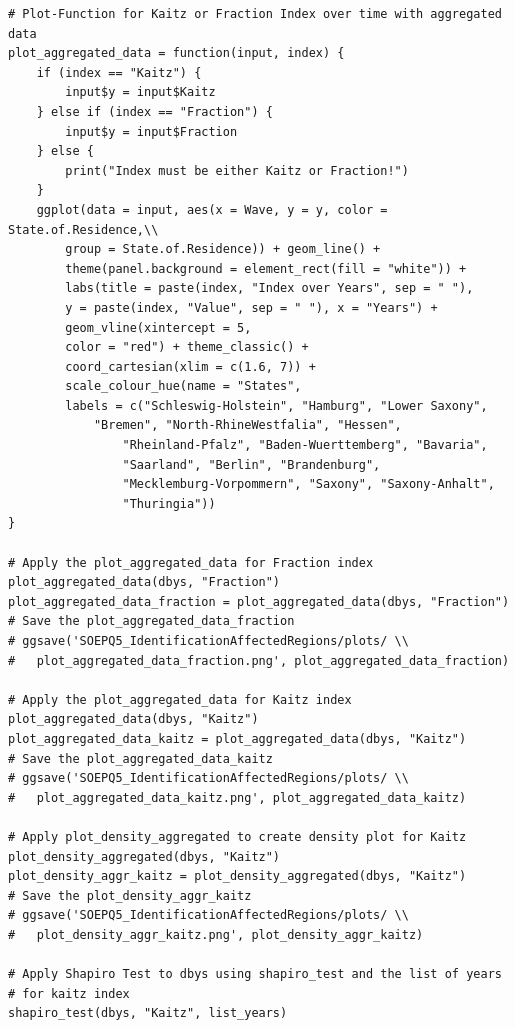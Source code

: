 \documentclass[a4paper]{article}
\begin{document}
{\begin{lstlisting}
# Plot-Function for Kaitz or Fraction Index over time with aggregated data
plot_aggregated_data = function(input, index) {
    if (index == "Kaitz") {
        input$y = input$Kaitz
    } else if (index == "Fraction") {
        input$y = input$Fraction
    } else {
        print("Index must be either Kaitz or Fraction!")
    }
    ggplot(data = input, aes(x = Wave, y = y, color = State.of.Residence,\\
    	group = State.of.Residence)) + geom_line() + 
        theme(panel.background = element_rect(fill = "white")) + 
        labs(title = paste(index, "Index over Years", sep = " "), 
        y = paste(index, "Value", sep = " "), x = "Years") + 
        geom_vline(xintercept = 5, 
        color = "red") + theme_classic() + 
        coord_cartesian(xlim = c(1.6, 7)) + 
        scale_colour_hue(name = "States", 
        labels = c("Schleswig-Holstein", "Hamburg", "Lower Saxony", 
        	"Bremen", "North-RhineWestfalia", "Hessen", 
            	"Rheinland-Pfalz", "Baden-Wuerttemberg", "Bavaria", 
            	"Saarland", "Berlin", "Brandenburg", 
            	"Mecklemburg-Vorpommern", "Saxony", "Saxony-Anhalt", 
                "Thuringia"))
}

# Apply the plot_aggregated_data for Fraction index
plot_aggregated_data(dbys, "Fraction")
plot_aggregated_data_fraction = plot_aggregated_data(dbys, "Fraction")
# Save the plot_aggregated_data_fraction 
# ggsave('SOEPQ5_IdentificationAffectedRegions/plots/ \\
#	plot_aggregated_data_fraction.png', plot_aggregated_data_fraction)

# Apply the plot_aggregated_data for Kaitz index
plot_aggregated_data(dbys, "Kaitz")
plot_aggregated_data_kaitz = plot_aggregated_data(dbys, "Kaitz")
# Save the plot_aggregated_data_kaitz 
# ggsave('SOEPQ5_IdentificationAffectedRegions/plots/ \\
#	plot_aggregated_data_kaitz.png', plot_aggregated_data_kaitz)

# Apply plot_density_aggregated to create density plot for Kaitz
plot_density_aggregated(dbys, "Kaitz")
plot_density_aggr_kaitz = plot_density_aggregated(dbys, "Kaitz")
# Save the plot_density_aggr_kaitz 
# ggsave('SOEPQ5_IdentificationAffectedRegions/plots/ \\
#	plot_density_aggr_kaitz.png', plot_density_aggr_kaitz)

# Apply Shapiro Test to dbys using shapiro_test and the list of years 
# for kaitz index
shapiro_test(dbys, "Kaitz", list_years)


\end{lstlisting}}
\end{document}
